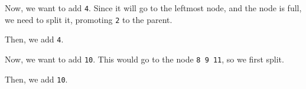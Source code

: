 \documentclass[a4paper, openany]{memoir}
\begin{document}
Now, we want to add \texttt{4}. Since it will go to the leftmost node, and the node is full, we need to split it, promoting \texttt{2} to the parent.
\begin{center}
\end{center}
Then, we add \texttt{4}.
\begin{center}
\end{center}
Now, we want to add \texttt{10}. This would go to the node \texttt{8 9 11}, so we first split.
\begin{center}
\end{center}
Then, we add \texttt{10}.
\begin{center}
\end{center}
\end{document}
